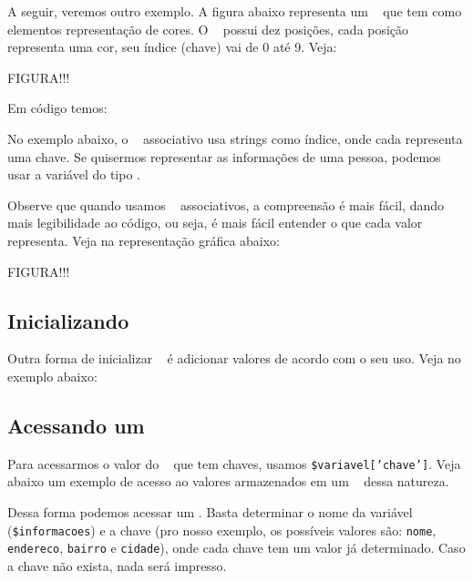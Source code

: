 A seguir, veremos outro exemplo. A figura abaixo representa um \tipoarray~ que tem 
como elementos representação de cores. O \tipoarray~ possui dez posições, 
cada posição representa uma cor, seu índice (chave) vai de 0 até 9. Veja:

FIGURA!!!

Em código temos:



No exemplo abaixo, o \tipoarray~ associativo usa strings como índice, onde cada 
\tipostring representa uma chave. Se quisermos representar as informações de uma
pessoa, podemos usar a variável do tipo \tipoarray.



Observe que quando usamos \tipoarrays~ associativos, a compreensão é mais fácil, 
dando mais legibilidade ao código, ou seja, é mais fácil entender o que cada valor
representa. Veja na representação gráfica abaixo:

FIGURA!!!

\subsection{Inicializando \tipoarrays}
\label{inicializando-arrays}

Outra forma de inicializar \tipoarrays~ é adicionar valores de acordo com o seu 
uso. Veja no exemplo abaixo:



\subsection{Acessando um \tipoarray}
\label{acessando-um-array}

Para acessarmos o valor do \tipoarray~ que tem chaves, usamos \texttt{\$variavel['chave']}. 
Veja abaixo um exemplo de acesso ao valores armazenados em um \tipoarray~ dessa natureza.



Dessa forma podemos acessar um \tipoarray. Basta determinar o nome da variável
(\texttt{\$informacoes}) e a chave (pro nosso exemplo, os possíveis valores são:
\texttt{nome}, \texttt{endereco}, \texttt{bairro} e \texttt{cidade}), onde cada chave tem 
um valor já determinado. Caso a chave não exista, nada será impresso.

